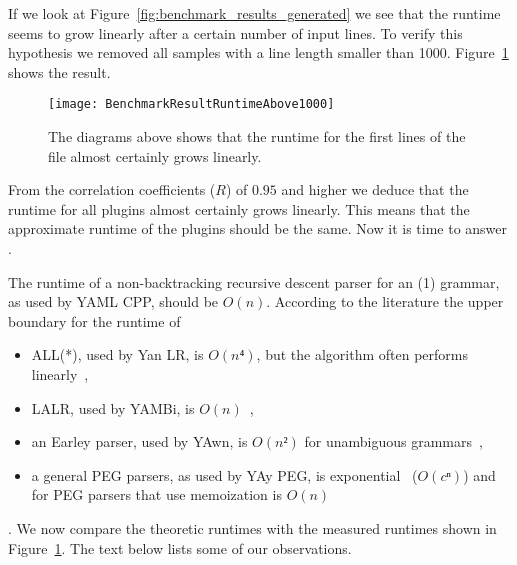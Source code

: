 If we look at Figure~\ref{fig:benchmark_results_generated} we see that the runtime seems to grow linearly after a certain number of input lines. To verify this hypothesis we removed all samples with a line length smaller than 1000. Figure~\ref{fig:benchmark_results_generated_above_1000} shows the result.

\begin{figure}[H]
  \centering
    \texttt{[image: BenchmarkResultRuntimeAbove1000]}
  \caption{The diagrams above shows that the runtime for the first lines of the file \FileGeneratedHundredThousand{} almost certainly grows linearly.}
  \label{fig:benchmark_results_generated_above_1000}
\end{figure}

From the correlation coefficients ($R$) of $0.95$ and higher we deduce that the runtime for all plugins almost certainly grows linearly. This means that the approximate runtime of the plugins should be the same. Now it is time to answer .

\speed*

The runtime of a non-backtracking recursive descent parser for an (1) grammar, as used by YAML CPP, should be $O(n)$. According to the literature the upper boundary for the runtime of

\begin{itemize}
  \item \gls{ALL(*)}, used by Yan LR, is $O(n⁴)$, but the algorithm often performs linearly~\cite[p. 1]{parr2014adaptive},
  \item LALR, used by YAMBi, is $O(n)$~\cite{baxter2017runtime},
  \item an Earley parser, used by YAwn, is $O(n²)$ for unambiguous grammars~\cite[p. 145]{hopcroft1969formal},
  \item a general PEG parsers, as used by YAy PEG, is exponential~\cite[p. 1]{moss2014derivatives} ($O(cⁿ)$) and for PEG parsers that use memoization is $O(n)$~\cite{ford2002packrat}
\end{itemize}

. We now compare the theoretic runtimes with the measured runtimes shown in Figure~\ref{fig:benchmark_results_generated_above_1000}. The text below lists some of our observations.

